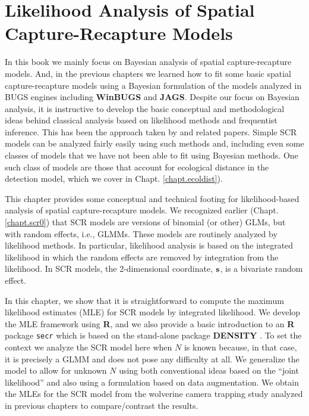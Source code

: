 \chapter{
Likelihood Analysis of Spatial Capture-Recapture Models
}
\label{chapt.mle}

\vspace{.3in}



In this book we mainly focus on Bayesian analysis of spatial
capture-recapture models. And, in the previous chapters we learned how
to fit some basic spatial capture-recapture models using a Bayesian
formulation of the models analyzed in BUGS engines including {\bf
  WinBUGS} and {\bf JAGS}.  Despite our focus on Bayesian analysis, it
is instructive to develop the basic conceptual and methodological
ideas behind classical analysis based on likelihood methods and
frequentist inference.  
This has been the approach taken by
\citet{borchers_efford:2008, dawson_efford:2009} and related papers.
Simple SCR models can be analyzed
fairly easily using such methods and, including even some classes of
models that we have not been able to fit using Bayesian methods. One
such class of models are those
that account for ecological distance in the detection model,
which we cover in  Chapt. \ref{chapt.ecoldist}).


This chapter provides some conceptual and technical footing for
likelihood-based analysis of spatial capture-recapture models. We
recognized earlier (Chapt. \ref{chapt.scr0}) that SCR models are versions of
binomial (or other) GLMs, but with random effects, i.e., GLMMs. These
models are 
routinely analyzed by likelihood methods. In particular, likelihood
analysis is based on the integrated likelihood in which the random
effects are removed by integration from the likelihood. In SCR models,
the 2-dimensional coordinate, ${\bf s}$, is a
bivariate random effect. 

In this chapter, we show that it is
straightforward to compute the maximum likelihood estimates (MLE) for
SCR models by integrated likelihood. We develop the MLE framework
using {\bf R}, and we also provide a basic introduction to an {\bf R} package
\mbox{\tt secr} \citep{efford:2011} which is based on the stand-alone
package 
{\bf DENSITY} \citep{efford_etal:2004}.
 To set the context we analyze the SCR model
here when $N$ is known because, in that case, it is precisely a GLMM and
does not pose any difficulty at all. We generalize the model to allow
for unknown $N$ using both conventional ideas based on the ``joint
likelihood'' \citep[e.g.,][]{borchers_etal:2002}
and also using a formulation
based on data augmentation.  We obtain the MLEs for 
the SCR model from the wolverine camera trapping study \citep{magoun_etal:2011}
 analyzed in previous chapters to compare/contrast the
results.

